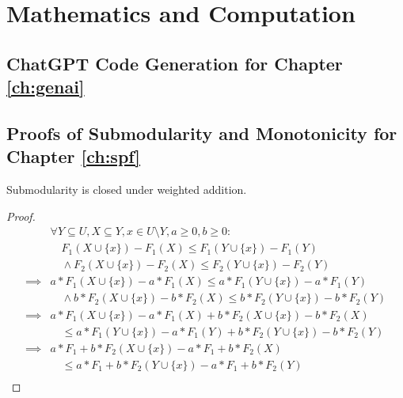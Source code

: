 \chapter{\label{app:math}Mathematics and Computation}

\minitoc

\section{ChatGPT Code Generation for Chapter \ref{ch:genai}}\label{app:prompt}

\section{Proofs of Submodularity and Monotonicity for Chapter \ref{ch:spf}}\label{app:spfmath}

\begin{theorem} 
    Submodularity is closed under weighted addition. \label{thm:submodularity_additive}
    \end{theorem}
    
    \begin{proof}
    \begin{equation}
        \label{eq:submodularity_additive}
        \begin{split}
            & \forall Y \subseteq U, X \subseteq Y, x \in U \setminus Y, a \geq 0, b \geq 0: \\
            & \quad F_1(X \cup \{x\}) - F_1(X) \leq F_1(Y \cup \{x\}) - F_1(Y) \\
            & \quad \land F_2(X \cup \{x\}) - F_2(X) \leq F_2(Y \cup \{x\}) - F_2(Y) \\
            \implies & a*F_1(X \cup \{x\}) - a*F_1(X) \leq a*F_1(Y \cup \{x\}) - a*F_1(Y) \\
            & \quad \land b*F_2(X \cup \{x\}) - b*F_2(X) \leq b*F_2(Y \cup \{x\}) - b*F_2(Y) \\
            \implies & a*F_1(X \cup \{x\}) - a*F_1(X) + b*F_2(X \cup \{x\}) - b*F_2(X) \\
            & \quad \leq a*F_1(Y \cup \{x\}) - a*F_1(Y) + b*F_2(Y \cup \{x\}) - b*F_2(Y) \\
            \implies & a*F_1+b*F_2(X \cup \{x\}) - a*F_1+b*F_2(X) \\
            & \quad \leq a*F_1+b*F_2(Y \cup \{x\}) - a*F_1+b*F_2(Y) \\ \nonumber
        \end{split}
    \end{equation}
    \end{proof}
    
